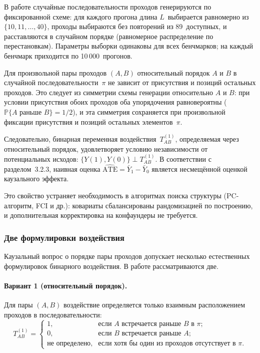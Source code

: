 В работе случайные последовательности проходов генерируются по фиксированной схеме: для каждого прогона длина $L$~выбирается равномерно из $\{10, 11, \dots, 40\}$, проходы выбираются без повторений из 89~доступных, и расставляются в случайном порядке (равномерное распределение по перестановкам). Параметры выборки одинаковы для всех бенчмарков; на каждый бенчмарк приходится по 10\,000~прогонов.

Для произвольной пары проходов $(A, B)$ относительный порядок $A$ и $B$ в случайной последовательности~$\pi$ не зависит от присутствия и позиций остальных проходов. Это следует из симметрии схемы генерации относительно $A$ и $B$: при условии присутствия обоих проходов оба упорядочения равновероятны ($\mathbb{P}\{A \text{ раньше } B\} = 1/2$), и эта симметрия сохраняется при произвольной фиксации присутствия и позиций остальных элементов~$\pi$.

Следовательно, бинарная переменная воздействия~$T_{AB}^{(1)}$, определяемая через относительный порядок, удовлетворяет условию независимости от потенциальных исходов: $\{Y(1), Y(0)\} \perp T_{AB}^{(1)}$. В соответствии с разделом~3.2.3, наивная оценка $\widehat{\text{ATE}} = \bar{Y}_1 - \bar{Y}_0$ является несмещённой оценкой каузального эффекта.

Это свойство устраняет необходимость в алгоритмах поиска структуры (PC-алгоритм, FCI и др.): ковариаты сбалансированы рандомизацией по построению, и дополнительная корректировка на конфаундеры не требуется.

\subsubsection{Две формулировки воздействия}

Каузальный вопрос о порядке пары проходов допускает несколько естественных формулировок бинарного воздействия. В работе рассматриваются две.

\paragraph{Вариант 1 (относительный порядок).} Для пары $(A, B)$ воздействие определяется только взаимным расположением проходов в последовательности:
\begin{equation*}
    T_{AB}^{(1)} = \begin{cases}
        1, & \text{если } A \text{ встречается раньше } B \text{ в } \pi; \\
        0, & \text{если } B \text{ встречается раньше } A; \\
        \text{не определено}, & \text{если хотя бы один из проходов отсутствует в } \pi.
    \end{cases}
\end{equation*}

